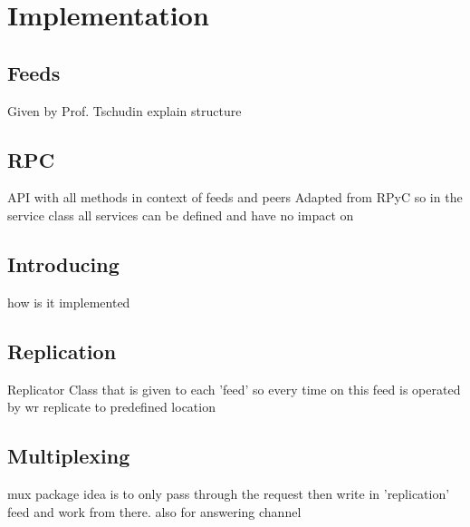 \chapter{Implementation}
\section{Feeds}
Given by Prof. Tschudin explain structure
\section{RPC}
API with all methods in context of feeds and peers
Adapted from RPyC so in the service class all services can be defined and have no impact on
\section{Introducing}
how is it implemented
\section{Replication}
Replicator Class that is given to each 'feed' so every time on this feed is operated by wr replicate to predefined location
\section{Multiplexing}
mux package idea is to only pass through the request then write in 'replication' feed and work from there.
also for answering channel
